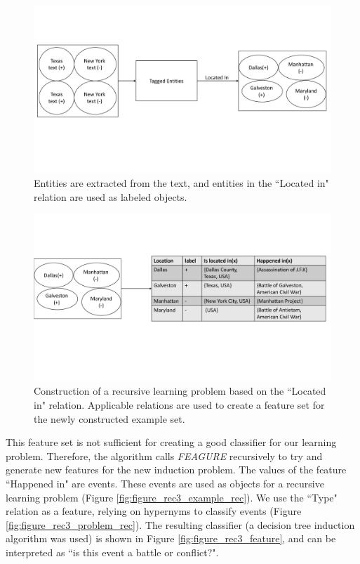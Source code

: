 \documentclass[twoside,11pt]{article}
\theoremstyle{definition}
\begin{document}
\begin{figure}[!h]
	\centering
	\includegraphics[width=\linewidth]{figure_rec3_example_new}
	\caption{Entities are extracted from the text, and entities in the ``Located in" relation are used as labeled objects.}
	\label{fig:figure_rec3_example}
\end{figure}

\begin{figure}[!h]
	\centering
	\includegraphics[width=\linewidth]{figure_rec3_problem_new}
	\caption{Construction of a recursive learning problem based on the ``Located in" relation. Applicable relations are used to create a feature set for the newly constructed example set.}
	\label{fig:figure_rec3_problem}
\end{figure}

This feature set is not sufficient for creating a good classifier for our learning problem. Therefore, the algorithm calls \emph{FEAGURE} recursively to try and generate new features for the new induction problem.
The values of the feature ``Happened in" are events. These events are used as objects for a recursive learning problem (Figure \ref{fig:figure_rec3_example_rec}).
We use the ``Type" relation as a feature, relying on hypernyms to classify events (Figure \ref{fig:figure_rec3_problem_rec}).
The resulting classifier (a decision tree induction algorithm was used) is shown in Figure \ref{fig:figure_rec3_feature}, and can be interpreted as ``is this event a battle or conflict?".
\end{document}
